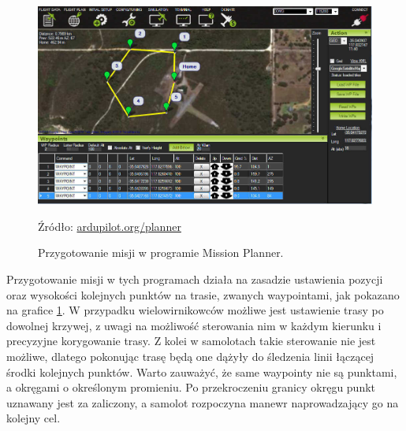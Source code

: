 \documentclass[12pt, a4paper]{article}
\begin{document}
\begin{figure}[ht]
    \centering
    \includegraphics[width=1\textwidth]{missionplanner}
    \caption{Przygotowanie misji w programie Mission Planner.}
    \small Źródło: \url{ardupilot.org/planner}
    \label{fig:missionplanner}
\end{figure}

Przygotowanie misji w tych programach działa na zasadzie ustawienia pozycji oraz wysokości kolejnych punktów na trasie, zwanych waypointami, jak pokazano na grafice \ref{fig:missionplanner}. W przypadku wielowirnikowców możliwe jest ustawienie trasy po dowolnej krzywej, z uwagi na możliwość sterowania nim w każdym kierunku i precyzyjne korygowanie trasy. Z kolei w samolotach takie sterowanie nie jest możliwe, dlatego pokonując trasę będą one dążyły do śledzenia linii łączącej środki kolejnych punktów. Warto zauważyć, że same waypointy nie są punktami, a okręgami o określonym promieniu. Po przekroczeniu granicy okręgu punkt uznawany jest za zaliczony, a samolot rozpoczyna manewr naprowadzający go na kolejny cel.
\FloatBarrier
\end{document}
